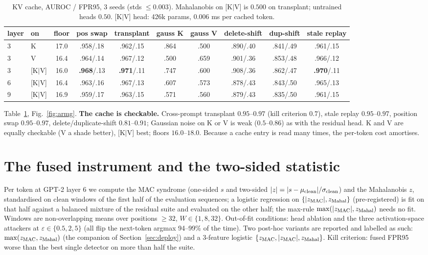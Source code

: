 \documentclass[10pt,twocolumn]{article}
\begin{document}
\begin{table}[t]
\centering\small
\begin{tabular}{l l c ccccccc}
\toprule
layer & on & floor & pos swap & transplant & gauss K & gauss V & delete-shift & dup-shift & stale replay\\
\midrule
3 & K & 17.0 & .958/.18 & .962/.15 & .864 & .500 & .890/.40 & .841/.49 & .961/.15\\
3 & V & 16.4 & .964/.14 & .967/.12 & .500 & .659 & .901/.36 & .853/.48 & .966/.12\\
3 & [K$|$V] & 16.0 & \textbf{.968}/.13 & \textbf{.971}/.11 & .747 & .600 & .908/.36 & .862/.47 & \textbf{.970}/.11\\
6 & [K$|$V] & 16.4 & .963/.16 & .967/.13 & .607 & .573 & .878/.43 & .843/.50 & .965/.13\\
9 & [K$|$V] & 16.9 & .959/.17 & .963/.15 & .571 & .560 & .879/.43 & .835/.50 & .961/.15\\
\bottomrule
\end{tabular}
\caption{KV cache, AUROC / FPR95, 3 seeds (stds $\le0.003$). Mahalanobis on [K$|$V] is
$0.500$ on transplant; untrained heads $0.50$. [K$|$V] head: 426k params, 0.006 ms per
cached token.}
\label{tab:armg}
\end{table}

Table~\ref{tab:armg}, Fig.~\ref{fig:armg}. \textbf{The cache is checkable.} Cross-prompt
transplant $0.95$--$0.97$ (kill criterion $0.7$), stale replay $0.95$--$0.97$, position
swap $0.95$--$0.97$, delete/duplicate-shift $0.81$--$0.91$; Gaussian noise on K or V is
weak ($0.5$--$0.86$) as with the residual head. K and V are equally checkable (V a
shade better), [K$|$V] best; floors $16.0$--$18.0$. Because a cache entry is read many
times, the per-token cost amortises.

\section{The fused instrument and the two-sided statistic}\label{sec:armj}
Per token at GPT-2 layer 6 we compute the MAC syndrome (one-sided $s$ and two-sided
$|z|=|s-\mu_{\rm clean}|/\sigma_{\rm clean}$) and the Mahalanobis $z$, standardised on
clean windows of the first half of the evaluation sequences; a logistic regression on
$\{|z_{\rm MAC}|, z_{\rm Mahal}\}$ (pre-registered) is fit on that half against a
balanced mixture of the residual suite and evaluated on the other half; the max-rule
$\max(|z_{\rm MAC}|, z_{\rm Mahal})$ needs no fit. Windows are non-overlapping means
over positions $\ge 32$, $W\in\{1,8,32\}$. Out-of-fit conditions: head ablation and the
three activation-space attackers at $\varepsilon\in\{0.5,2,5\}$ (all flip the
next-token argmax 94--99\% of the time). Two post-hoc variants are reported and
labelled as such: $\max(z_{\rm MAC}, z_{\rm Mahal})$ (the companion of
Section~\ref{sec:deploy}) and a 3-feature logistic $\{z_{\rm MAC}, |z_{\rm MAC}|,
z_{\rm Mahal}\}$. Kill criterion: fused FPR95 worse than the best single detector on
more than half the suite.
\end{document}
